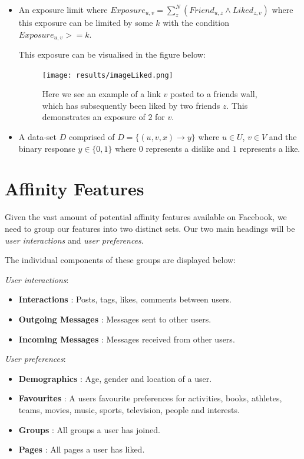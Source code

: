 \begin{itemize}
\item An exposure limit where $Exposure_{u,v} = \displaystyle\sum_{z}^{N} (Friend_{u,z} \wedge Liked_{z,v})$ where this exposure can be 
limited by some $k$ with the condition $Exposure_{u,v} >= k$.

This exposure can be visualised in the figure below:

\begin{figure}[tbh!]
	\begin{center}
		\texttt{[image: results/imageLiked.png]}
		\caption{Here we see an example of a link $v$ posted to a friends wall, which has subsequently been liked by two friends $z$. This 
				 demonstrates an exposure of $2$ for $v$.}
	\end{center}
\end{figure}

\item A data-set $D$ comprised of $D = \{(u,v,x) \to y\}$ where $u \in U$, $v \in V$ and the binary response $y \in \{0,1\}$ 
where $0$ represents a dislike and $1$ represents a like. 
\end{itemize}

\section{Affinity Features}
\label{sec:features}

Given the vast amount of potential affinity features available on Facebook, we need to group our features into two 
distinct sets. Our two main headings will be \emph{user interactions} and \emph{user preferences}.

The individual components of these groups are displayed below:

\emph{User interactions}:
\begin{itemize}
\item \textbf{Interactions} : Posts, tags, likes, comments between users.
\item \textbf{Outgoing Messages} : Messages sent to other users.
\item \textbf{Incoming Messages} : Messages received from other users.
\end{itemize}

\emph{User preferences}:
\begin{itemize}
\item \textbf{Demographics} : Age, gender and location of a user.
\item \textbf{Favourites} : A users favourite preferences for activities, books, athletes, teams, movies, music, sports, television, people and interests.
\item \textbf{Groups} : All groups a user has joined.
\item \textbf{Pages} :  All pages a user has liked.
\end{itemize}

